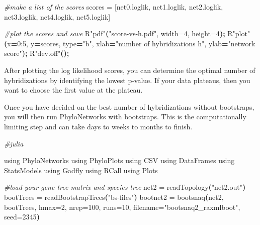 \documentclass[
  12pt,
]{article}
\newenvironment{Shaded}{\begin{snugshade}}{\end{snugshade}}
\newcommand{\CommentTok}[1]{\textcolor[rgb]{0.56,0.35,0.01}{\textit{#1}}}
\newcommand{\ErrorTok}[1]{\textcolor[rgb]{0.64,0.00,0.00}{\textbf{#1}}}
\newcommand{\ExtensionTok}[1]{#1}
\newcommand{\KeywordTok}[1]{\textcolor[rgb]{0.13,0.29,0.53}{\textbf{#1}}}
\newcommand{\NormalTok}[1]{#1}
\newcommand{\OperatorTok}[1]{\textcolor[rgb]{0.81,0.36,0.00}{\textbf{#1}}}
\newcommand{\StringTok}[1]{\textcolor[rgb]{0.31,0.60,0.02}{#1}}
\newcommand{\VariableTok}[1]{\textcolor[rgb]{0.00,0.00,0.00}{#1}}
\begin{document}
\begin{Shaded}
\begin{Highlighting}[]
\CommentTok{\#make a list of the scores}
\ExtensionTok{scores}\NormalTok{ = [net0.loglik, net1.loglik, net2.loglik, net3.loglik, net4.loglik, net5.loglik]}

\CommentTok{\#plot the scores and save}
\ExtensionTok{R}\StringTok{"pdf"}\ErrorTok{(}\StringTok{"score{-}vs{-}h.pdf"}\ExtensionTok{,}\NormalTok{ width=4, height=4}\KeywordTok{);}
\ExtensionTok{R}\StringTok{"plot"}\ErrorTok{(}\VariableTok{x}\OperatorTok{=}\NormalTok{0:5, }\VariableTok{y}\OperatorTok{=}\NormalTok{scores, }\VariableTok{type}\OperatorTok{=}\StringTok{"b"}\NormalTok{, }\VariableTok{xlab}\OperatorTok{=}\StringTok{"number of hybridizations h"}\NormalTok{, }\VariableTok{ylab}\OperatorTok{=}\StringTok{"network score"}\KeywordTok{);}
\ExtensionTok{R}\StringTok{"dev.off"}\ErrorTok{(}\KeywordTok{);}
\end{Highlighting}
\end{Shaded}

After plotting the log likelihood scores, you can determine the optimal number of hybridizations by identifying the lowest p-value. If your data plateaus, then you want to choose the first value at the plateau.

Once you have decided on the best number of hybridizations without bootstraps, you will then run PhyloNetworks with bootstraps. This is the computationally limiting step and can take days to weeks to months to finish.

\begin{Shaded}
\begin{Highlighting}[]
\CommentTok{\#julia}

\ExtensionTok{using}\NormalTok{ PhyloNetworks}
\ExtensionTok{using}\NormalTok{ PhyloPlots}
\ExtensionTok{using}\NormalTok{ CSV}
\ExtensionTok{using}\NormalTok{ DataFrames}
\ExtensionTok{using}\NormalTok{ StatsModels}
\ExtensionTok{using}\NormalTok{ Gadfly}
\ExtensionTok{using}\NormalTok{ RCall}
\ExtensionTok{using}\NormalTok{ Plots}

\CommentTok{\#load your gene tree matrix and species tree}
\ExtensionTok{net2}\NormalTok{ = readTopology}\ErrorTok{(}\StringTok{"net2.out"}\KeywordTok{)}
\ExtensionTok{bootTrees}\NormalTok{ = readBootstrapTrees}\ErrorTok{(}\StringTok{"bs{-}files"}\KeywordTok{)}
\ExtensionTok{bootnet2}\NormalTok{ = bootsnaq}\ErrorTok{(}\ExtensionTok{net2,}\NormalTok{ bootTrees, hmax=2, nrep=100, runs=10, filename=}\StringTok{"bootsnaq2\_raxmlboot"}\NormalTok{, seed=2345}\KeywordTok{)}
\end{Highlighting}
\end{Shaded}
\end{document}
